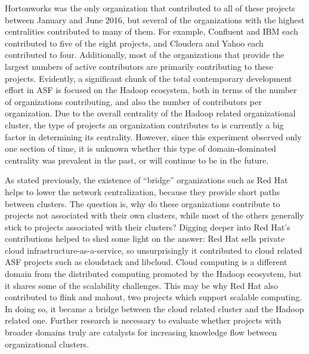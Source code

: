 Hortonworks was the only organization that contributed to all of these projects between January and June 2016, but several of the organizations with the highest centralities contributed to many of them. For example, Confluent and IBM each contributed to five of the eight projects, and Cloudera and Yahoo each contributed to four. Additionally, most of the organizations that provide the largest numbers of active contributors are primarily contributing to these projects. Evidently, a significant chunk of the total contemporary development effort in ASF is focused on the Hadoop ecosystem, both in terms of the number of organizations contributing, and also the number of contributors per organization. Due to the overall centrality of the Hadoop related organizational cluster, the type of projects an organization contributes to is currently a big factor in determining its centrality. However, since this experiment observed only one section of time, it is unknown whether this type of domain-dominated centrality was prevalent in the past, or will continue to be in the future.

As stated previously, the existence of ``bridge'' organizations such as Red Hat helps to lower the network centralization, because they provide short paths between clusters. The question is, why do these organizations contribute to projects not associated with their own clusters, while most of the others generally stick to projects associated with their clusters? Digging deeper into Red Hat's contributions helped to shed some light on the answer: Red Hat sells private cloud infrastructure-as-a-service\cite{redhat}, so unsurprisingly it contributed to cloud related ASF projects such as cloudstack and libcloud. Cloud computing is a different domain from the distributed computing promoted by the Hadoop ecosystem, but it shares some of the scalability challenges. This may be why Red Hat also contributed to flink and mahout, two projects which support scalable computing. In doing so, it became a bridge between the cloud related cluster and the Hadoop related one. Further research is necessary to evaluate whether projects with broader domains truly are catalysts for increasing knowledge flow between organizational clusters.  


